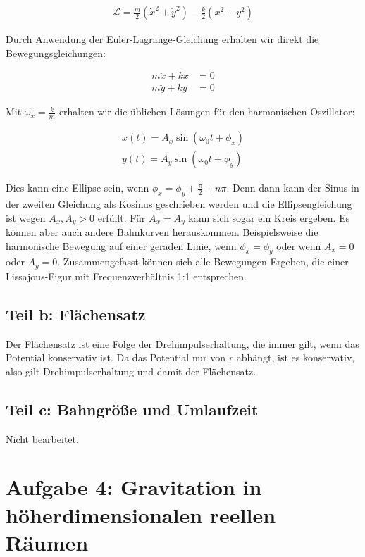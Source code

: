 \documentclass[a4paper,german,12pt,smallheadings]{scrartcl}
\begin{document}
\begin{align*}
  \mathcal{L} = \frac{m}{2}(\dot{x}^2 + \dot{y}^2) - \frac{k}{2}(x^2 + y^2)
\end{align*}

Durch Anwendung der Euler-Lagrange-Gleichung erhalten wir direkt die
Bewegungsgleichungen:

\begin{align*}
  m\ddot{x} + kx &= 0\\
  m\ddot{y} + ky &= 0
\end{align*}

Mit $\omega_{x} = \frac{k}{m}$ erhalten wir die üblichen Lösungen für den
harmonischen Oszillator:

\begin{align*}
  x(t) = A_x \sin(\omega_0 t + \phi_x) \\
  y(t) = A_y \sin(\omega_0 t + \phi_y)
\end{align*}

Dies kann eine Ellipse sein, wenn $\phi_x = \phi_y + \frac{\pi}{2} + n\pi$.
Denn dann kann der Sinus in der zweiten Gleichung als Kosinus geschrieben
werden und die Ellipsengleichung ist wegen $A_x, A_y > 0$ erfüllt. Für $A_x =
A_y$ kann sich sogar ein Kreis ergeben. Es können aber auch andere Bahnkurven
herauskommen. Beispielsweise die harmonische Bewegung auf einer geraden Linie,
wenn $\phi_x = \phi_y$ oder wenn $A_x = 0$ oder $A_y = 0$. Zusammengefasst
können sich alle Bewegungen Ergeben, die einer Lissajous-Figur mit
Frequenzverhältnis 1:1 entsprechen.

\subsection*{Teil b: Flächensatz}

Der Flächensatz ist eine Folge der Drehimpulserhaltung, die immer gilt, wenn
das Potential konservativ ist. Da das Potential nur von $r$ abhängt, ist es
konservativ, also gilt Drehimpulserhaltung und damit der Flächensatz.

\subsection*{Teil c: Bahngröße und Umlaufzeit}

Nicht bearbeitet.

\section*{Aufgabe 4: Gravitation in höherdimensionalen reellen Räumen}
\end{document}
